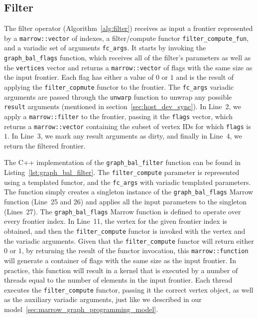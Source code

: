 \subsection{Filter}

The filter operator (Algorithm~\ref{alg:filter}) receives as input a frontier represented by a \texttt{marrow::vector} of indexes, a filter/compute functor \texttt{filter\_compute\_fun}, and a variadic set of arguments \texttt{fc\_args}. It starts by invoking the \texttt{graph\_bal\_flags} function, which receives all of the filter's parameters as well as the \texttt{vertices} vector and returns a \texttt{marrow::vector} of flags with the same size as the input frontier. Each flag has either a value of $0$ or $1$ and is the result of applying the \texttt{filter\_copmute} functor to the frontier. The \texttt{fc\_args} variadic arguments are passed through the \texttt{unwarp} function to unwrap any possible \texttt{result} arguments (mentioned in section~\ref{sec:host_dev_sync}). In Line~2, we apply a \texttt{marrow::filter} to the frontier, passing it the \texttt{flags} vector, which returns a \texttt{marrow::vector} containing the subset of vertex IDs for which \texttt{flags} is $1$. In Line~3, we mark any result arguments as dirty, and finally in Line~4, we return the filtered frontier.



The C++ implementation of the \texttt{graph\_bal\_filter} function can be found in Listing~\ref{lst:graph_bal_filter}. The \texttt{filter\_compute} parameter is represented using a templated functor, and the \texttt{fc\_args} with variadic templated parameters.  The function simply creates a singleton instance of the \texttt{graph\_bal\_flags} Marrow function (Line~25 and 26) and applies all the input parameters to the singleton (Lines~27). The \texttt{graph\_bal\_flags}  Marrow function is defined to operate over every frontier index. In Line~11, the vertex for the given frontier index is obtained, and then the \texttt{filter\_compute} functor is invoked with the vertex and the variadic arguments. Given that the \texttt{filter\_compute} functor will return either $0$ or $1$, by returning the result of the functor invocation, this \texttt{marrow::function} will generate a container of flags with the same size as the input frontier. In practice, this function will result in a kernel that is executed by a number of threads equal to the number of elements in the input frontier. Each thread executes the \texttt{filter\_compute} functor, passing it the correct vertex object, as well as the auxiliary variadic arguments, just like we described in our model~\ref{sec:marrow_graph_programming_model}.

